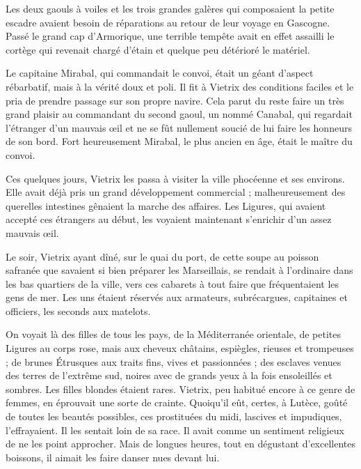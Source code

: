 \documentclass[a4paper, 11pt, oneside, polutonikogreek, french]{article}
\begin{document}
Les deux gaouls à voiles et les trois grandes galères qui composaient la petite escadre avaient besoin de réparations au retour de leur voyage en Gascogne. Passé le grand cap d'Armorique, une terrible tempête avait en effet assailli le cortège qui revenait chargé d'étain et quelque peu détérioré le matériel.

Le capitaine Mirabal, qui commandait le convoi, était un géant d'aspect rébarbatif, mais à la vérité doux et poli. Il fit à Vietrix des conditions faciles et le pria de prendre passage sur son propre navire. Cela parut du reste faire un très grand plaisir au commandant du second gaoul, un nommé Canabal, qui regardait l'étranger d'un mauvais œil et ne se fût nullement soucié de lui faire les honneurs de son bord. Fort heureusement Mirabal, le plus ancien en âge, était le maître du convoi.

\bigskip
\centerline{\EightStarTaper}
\centerline{\EightStarTaper\EightStarTaper}
\bigskip

Ces quelques jours, Vietrix les passa à visiter la ville phocéenne et ses environs. Elle avait déjà pris un grand développement commercial ; malheureusement des querelles intestines gênaient la marche des affaires. Les Ligures, qui avaient accepté ces étrangers au début, les voyaient maintenant s'enrichir d'un assez mauvais œil.

Le soir, Vietrix ayant dîné, sur le quai du port, de cette soupe au poisson safranée que savaient si bien préparer les Marseillais, se rendait à l'ordinaire dans les bas quartiers de la ville, vers ces cabarets à tout faire que fréquentaient les gens de mer. Les uns étaient réservés aux armateurs, subrécargues, capitaines et officiers, les seconds aux matelots.

On voyait là des filles de tous les pays, de la Méditerranée orientale, de petites Ligures au corps rose, mais aux cheveux châtains, espiègles, rieuses et trompeuses ; de brunes Étrusques aux traits fins, vives et passionnées ; des esclaves venues des terres de l'extrême sud, noires avec de grands yeux à la fois ensoleillés et sombres. Les filles blondes étaient rares. Vietrix, peu habitué encore à ce genre de femmes, en éprouvait une sorte de crainte. Quoiqu'il eût, certes, à Lutèce, goûté de toutes les beautés possibles, ces prostituées du midi, lascives et impudiques, l'effrayaient. Il les sentait loin de sa race. Il avait comme un sentiment religieux de ne les point approcher. Mais de longues heures, tout en dégustant d'excellentes boissons, il aimait les faire danser nues devant lui.
\end{document}
